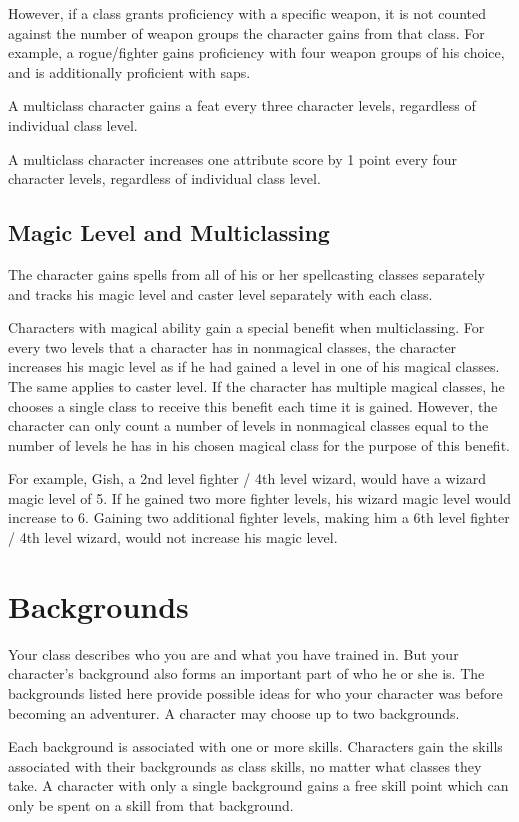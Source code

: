 However, if a class grants proficiency with a specific weapon, it is not counted against the number of weapon groups the character gains from that class. For example, a rogue/fighter gains proficiency with four weapon groups of his choice, and is additionally proficient with saps.

 A multiclass character gains a feat every three character levels, regardless of individual class level.

 A multiclass character increases one attribute score by 1 point every four character levels, regardless of individual class level.

\subsection{Magic Level and Multiclassing} The character gains spells from all of his or her spellcasting classes separately and tracks his magic level and caster level separately with each class.

Characters with magical ability gain a special benefit when multiclassing. For every two levels that a character has in nonmagical classes, the character increases his magic level as if he had gained a level in one of his magical classes. The same applies to caster level. If the character has multiple magical classes, he chooses a single class to receive this benefit each time it is gained. However, the character can only count a number of levels in nonmagical classes equal to the number of levels he has in his chosen magical class for the purpose of this benefit.

For example, Gish, a 2nd level fighter / 4th level wizard, would have a wizard magic level of 5. If he gained two more fighter levels, his wizard magic level would increase to 6. Gaining two additional fighter levels, making him a 6th level fighter / 4th level wizard, would not increase his magic level.

\section{Backgrounds}
Your class describes who you are and what you have trained in. But your character's background also forms an important part of who he or she is. The backgrounds listed here provide possible ideas for who your character was before becoming an adventurer. A character may choose up to two backgrounds.

Each background is associated with one or more skills. Characters gain the skills associated with their backgrounds as class skills, no matter what classes they take. A character with only a single background gains a free skill point which can only be spent on a skill from that background.

